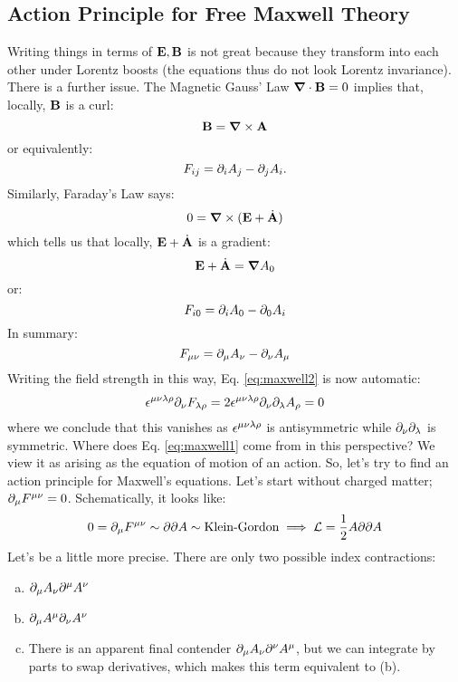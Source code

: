 \subsection{Action Principle for Free Maxwell Theory}
Writing things in terms of $\mathbf{E}, \mathbf{B}$ is not great because they transform into each other under Lorentz boosts (the equations thus do not look Lorentz invariance). There is a further issue. The Magnetic Gauss' Law $\nabla \cdot \v{B} = 0$ implies that, locally, $\mathbf{B}$ is a curl:
\begin{equation}
    \v{B} = \nabla \times \v{A}
\end{equation}
or equivalently:
\begin{equation}
    F_{ij} = \partial_i A_j - \partial_j A_i.
\end{equation}
Similarly, Faraday's Law says:
\begin{equation}
    0 = \nabla \times (\v{E} + \dot{\v{A}})
\end{equation}
which tells us that locally, $\mathbf{E} + \dot{\mathbf{A}}$ is a gradient:
\begin{equation}
    \v{E} + \dot{\v{A}} = \nabla A_0
\end{equation}
or:
\begin{equation}
    F_{i0} = \partial_i A_0 - \partial_0 A_i
\end{equation}
In summary:
\begin{equation}
    F_{\mu\nu} = \partial_\mu A_\nu - \partial_\nu A_\mu
\end{equation}
Writing the field strength in this way, Eq. \eqref{eq:maxwell2} is now automatic:
\begin{equation}
    \epsilon^{\mu\nu\lambda\rho}\partial_\nu F_{\lambda\rho} = 2\epsilon^{\mu\nu\lambda\rho}\partial_\nu\partial_\lambda A_\rho = 0
\end{equation}
where we conclude that this vanishes as $\epsilon^{\mu\nu\lambda\rho}$ is antisymmetric while $\partial_\nu\partial_\lambda$ is symmetric. Where does Eq. \eqref{eq:maxwell1} come from in this perspective? We view it as arising as the equation of motion of an action. So, let's try to find an action principle for Maxwell's equations. Let's start without charged matter; $\partial_\mu F^{\mu\nu} = 0$. Schematically, it looks like:
\begin{equation}
    0 = \partial_\mu F^{\mu\nu} \sim \partial\partial A \sim \text{Klein-Gordon} \implies \mathcal{L} = \frac{1}{2}A\partial\partial A
\end{equation}
Let's be a little more precise. There are only two possible index contractions:
\begin{enumerate}[(a)]
    \item $\partial_\mu A_\nu \partial^\mu A^\nu$
    \item $\partial_\mu A^\mu \partial_\nu A^\nu$
    \item There is an apparent final contender $\partial_\mu A_\nu \partial^\nu A^\mu$, but we can integrate by parts to swap derivatives, which makes this term equivalent to (b).
\end{enumerate}
